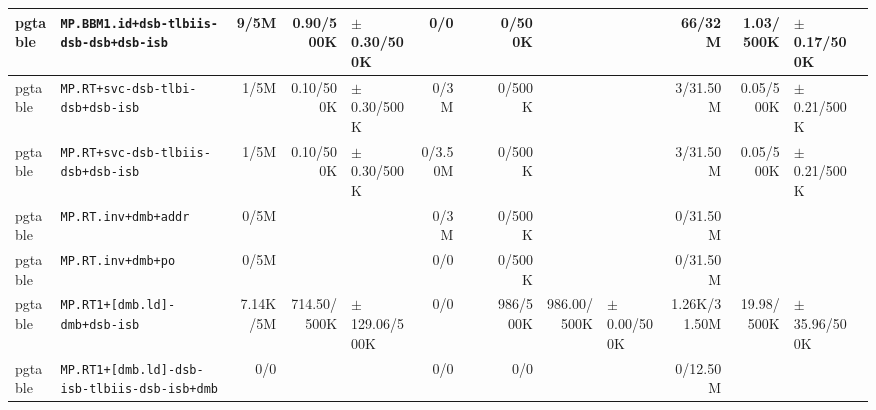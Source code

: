 \begin{tabular}{l l  | r r l | r r l | r r l | r r l l}
         pgtable &               \verb|MP.BBM1.id+dsb-tlbiis-dsb-dsb+dsb-isb| &           9/5M &             0.90/500K &   $\pm$ 0.30/500K &            0/0 &                       &                 &         0/500K &                       &                   &         66/32M &             1.03/500K &   $\pm$ 0.17/500K & \\ \hline 
         pgtable &                      \verb|MP.RT+svc-dsb-tlbi-dsb+dsb-isb| &           1/5M &             0.10/500K &   $\pm$ 0.30/500K &           0/3M &                       &                 &         0/500K &                       &                   &       3/31.50M &             0.05/500K &   $\pm$ 0.21/500K & \\ \hline 
         pgtable &                    \verb|MP.RT+svc-dsb-tlbiis-dsb+dsb-isb| &           1/5M &             0.10/500K &   $\pm$ 0.30/500K &        0/3.50M &                       &                 &         0/500K &                       &                   &       3/31.50M &             0.05/500K &   $\pm$ 0.21/500K & \\ \hline 
         pgtable &                                  \verb|MP.RT.inv+dmb+addr| &           0/5M &                       &                   &           0/3M &                       &                 &         0/500K &                       &                   &       0/31.50M &                       &                   & \\ \hline 
         pgtable &                                    \verb|MP.RT.inv+dmb+po| &           0/5M &                       &                   &            0/0 &                       &                 &         0/500K &                       &                   &       0/31.50M &                       &                   & \\ \hline 
         pgtable &                         \verb|MP.RT1+[dmb.ld]-dmb+dsb-isb| &       7.14K/5M &           714.50/500K & $\pm$ 129.06/500K &            0/0 &                       &                 &       986/500K &           986.00/500K &   $\pm$ 0.00/500K &   1.26K/31.50M &            19.98/500K &  $\pm$ 35.96/500K & \\ \hline 
         pgtable &          \verb|MP.RT1+[dmb.ld]-dsb-isb-tlbiis-dsb-isb+dmb| &            0/0 &                       &                   &            0/0 &                       &                 &            0/0 &                       &                   &       0/12.50M &                       &                   & \\ \hline 

\end{tabular}
